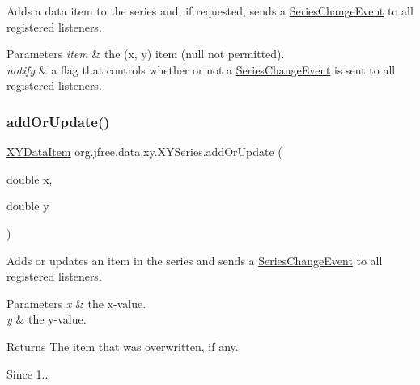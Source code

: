 Adds a data item to the series and, if requested, sends a \mbox{\hyperlink{}{Series\+Change\+Event}} to all registered listeners.


\begin{DoxyParams}{Parameters}
{\em item} & the (x, y) item ({\ttfamily null} not permitted). \\
\hline
{\em notify} & a flag that controls whether or not a \mbox{\hyperlink{}{Series\+Change\+Event}} is sent to all registered listeners. \\
\hline
\end{DoxyParams}
\mbox{\label{classorg_1_1jfree_1_1data_1_1xy_1_1_x_y_series_a20ce5647cc63fa95fb66295a18a5d09d}} 
\subsubsection{\texorpdfstring{add\+Or\+Update()}{addOrUpdate()}\hspace{0.1cm}{\footnotesize\ttfamily [1/3]}}
{\footnotesize\ttfamily \mbox{\hyperlink{classorg_1_1jfree_1_1data_1_1xy_1_1_x_y_data_item}{X\+Y\+Data\+Item}} org.\+jfree.\+data.\+xy.\+X\+Y\+Series.\+add\+Or\+Update (\begin{DoxyParamCaption}\item[{double}]{x,  }\item[{double}]{y }\end{DoxyParamCaption})}

Adds or updates an item in the series and sends a \mbox{\hyperlink{}{Series\+Change\+Event}} to all registered listeners.


\begin{DoxyParams}{Parameters}
{\em x} & the x-\/value. \\
\hline
{\em y} & the y-\/value.\\
\hline
\end{DoxyParams}
\begin{DoxyReturn}{Returns}
The item that was overwritten, if any.
\end{DoxyReturn}
\begin{DoxySince}{Since}
1.. 
\end{DoxySince}
\mbox{\label{classorg_1_1jfree_1_1data_1_1xy_1_1_x_y_series_af14c3bb52923907689696b162ba8a078}} 
